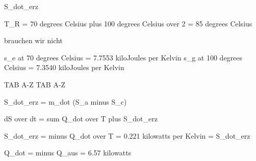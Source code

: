 S_dot_erz

T_R = 70 degrees Celsius plus 100 degrees Celsius over 2 = 85 degrees Celsius

brauchen wir nicht

s_e at 70 degrees Celsius = 7.7553 kiloJoules per Kelvin
s_g at 100 degrees Celsius = 7.3540 kiloJoules per Kelvin

TAB A-Z
TAB A-Z

S_dot_erz = m_dot (S_a minus S_c)

dS over dt = sum Q_dot over T plus S_dot_erz

S_dot_erz = minus Q_dot over T = 0.221 kilowatts per Kelvin = S_dot_erz

Q_dot = minus Q_aus = 6.57 kilowatts
